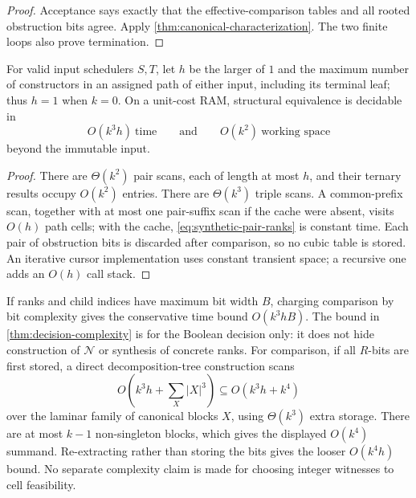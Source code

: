 \begin{proof}
Acceptance says exactly that the effective-comparison tables and all rooted
obstruction bits agree.  Apply \autoref{thm:canonical-characterization}.  The
two finite loops also prove termination.
\end{proof}

\begin{theorem}
\label{thm:decision-complexity}
For valid input schedulers \(S,T\), let \(h\) be the larger of \(1\) and the
maximum number of constructors in an assigned path of either input, including
its terminal leaf; thus \(h=1\) when \(k=0\).  On a unit-cost RAM, structural
equivalence is decidable in
\begin{equation}
  O(k^3h)\ \text{time}
  \qquad\text{and}\qquad
  O(k^2)\ \text{working space}
  \label{eq:decision-complexity}
\end{equation}
beyond the immutable input.
\end{theorem}

\begin{proof}
There are \(\Theta(k^2)\) pair scans, each of length at most \(h\), and their
ternary results occupy \(O(k^2)\) entries.  There are
\(\Theta(k^3)\) triple scans.  A common-prefix scan, together with at most one
pair-suffix scan if the cache were absent, visits \(O(h)\) path cells; with the
cache, \autoref{eq:synthetic-pair-ranks} is constant time.  Each pair of
obstruction bits is discarded after comparison, so no cubic table is stored.
An iterative cursor implementation uses constant transient space; a recursive
one adds an \(O(h)\) call stack.
\end{proof}

If ranks and child indices have maximum bit width \(B\), charging comparison
by bit complexity gives the conservative time bound \(O(k^3hB)\).  The bound
in \autoref{thm:decision-complexity} is for the Boolean decision only: it does
not hide construction of \(\mathcal N\) or synthesis of concrete ranks.  For
comparison, if all \(R\)-bits are first stored, a direct decomposition-tree
construction scans
\begin{equation}
  O\!\left(k^3h+\sum_X |X|^3\right)
  \subseteq O(k^3h+k^4)
  \label{eq:normal-form-construction-cost}
\end{equation}
over the laminar family of canonical blocks \(X\), using
\(\Theta(k^3)\) extra storage.  There are at most \(k-1\) non-singleton
blocks, which gives the displayed \(O(k^4)\) summand.  Re-extracting rather
than storing the bits gives the looser \(O(k^4h)\) bound.  No separate
complexity claim is made for choosing integer witnesses to cell feasibility.

